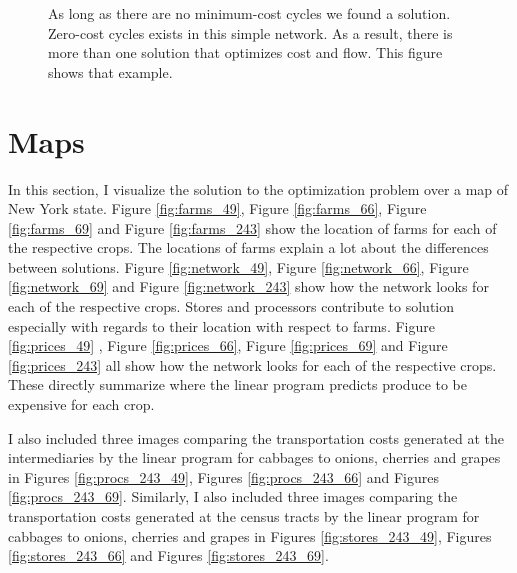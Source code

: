 \documentclass{report}
\begin{document}
\begin{figure}[!t]
\centering
\begin{framed}
\caption{As long as there are no minimum-cost cycles we found a solution. Zero-cost cycles exists in this simple network. As a result, there is more than one solution that optimizes cost and flow. This figure shows that example.}
\label{fig:example6}
\end{framed}
\end{figure}

\section{Maps}

In this section, I visualize the solution to the optimization problem over a map of New York state. Figure \ref{fig:farms_49}, Figure \ref{fig:farms_66}, Figure \ref{fig:farms_69} and Figure \ref{fig:farms_243} show the location of farms for each of the respective crops. The locations of farms explain a lot about the differences between solutions. Figure \ref{fig:network_49}, Figure \ref{fig:network_66}, Figure \ref{fig:network_69} and Figure \ref{fig:network_243} show how the network looks for each of the respective crops. Stores and processors contribute to solution especially with regards to their location with respect to farms.  Figure \ref{fig:prices_49} , Figure \ref{fig:prices_66}, Figure \ref{fig:prices_69} and Figure \ref{fig:prices_243} all show how the network looks for each of the respective crops. These directly summarize where the linear program predicts produce to be expensive for each crop.

I also included three images comparing the transportation costs generated at the intermediaries by the linear program for cabbages to onions, cherries and grapes in Figures \ref{fig:procs_243_49}, Figures \ref{fig:procs_243_66} and Figures \ref{fig:procs_243_69}. Similarly, I also included three images comparing the transportation costs generated at the census tracts by the linear program for cabbages to onions, cherries and grapes in Figures \ref{fig:stores_243_49}, Figures \ref{fig:stores_243_66} and Figures \ref{fig:stores_243_69}.
\end{document}
